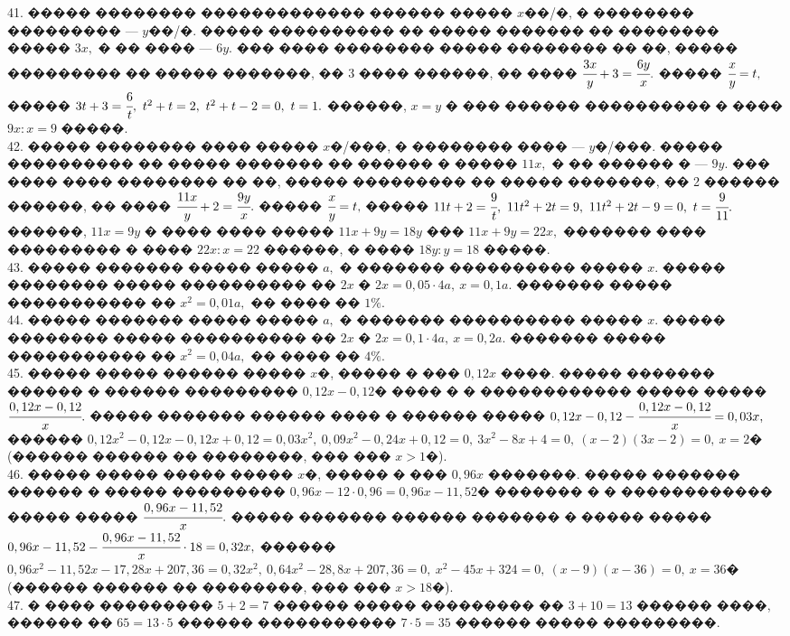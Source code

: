 \documentclass[12pt]{article}
\begin{document}
41. ����� �������� ������������� ������ ����� $x$��/�, � �������� ��������� --- $y$��/�. ����� ���������� �� ����� ������� �� �������� ����� $3x,$ � �� ���� --- $6y.$ ��� ���� �������� ����� �������� �� ��, ����� ��������� �� ����� �������, �� 3 ���� ������, �� ���� $\cfrac{3x}{y}+3=\cfrac{6y}{x}.$ ����� $\cfrac{x}{y}=t,$ ����� $3t+3=\cfrac{6}{t},\ t^2+t=2,\ t^2+t-2=0,\ t=1.$ ������, $x=y$ � ��� ������ ���������� � ���� $9x:x=9$ �����.\\
42. ����� �������� ���� ����� $x$�/���, � �������� ���� --- $y$�/���. ����� ���������� �� ����� ������� �� ������ � ����� $11x,$ � �� ������ � --- $9y.$ ��� ���� ���� �������� �� ��, ����� ��������� �� ����� �������, �� 2 ������ ������, �� ���� $\cfrac{11x}{y}+2=\cfrac{9y}{x}.$ ����� $\cfrac{x}{y}=t,$ ����� $11t+2=\cfrac{9}{t},\ 11t^2+2t=9,\ 11t^2+2t-9=0,\ t=\cfrac{9}{11}.$ ������, $11x=9y$ � ���� ���� ����� $11x+9y=18y$ ��� $11x+9y=22x,$ ������� ���� ��������� � ���� $22x:x=22$ ������, � ���� $18y:y=18$ �����.\\
43. ����� ������� ����� ����� $a,$ � ������� ���������� ����� $x.$ ����� �������� ����� ���������� �� $2x$ � $2x=0,05\cdot4a,\ x=0,1a.$ ������� ����� ����������� �� $x^2=0,01a,$ �� ���� �� $1\%.$\\
44. ����� ������� ����� ����� $a,$ � ������� ���������� ����� $x.$ ����� �������� ����� ���������� �� $2x$ � $2x=0,1\cdot4a,\ x=0,2a.$ ������� ����� ����������� �� $x^2=0,04a,$ �� ���� �� $4\%.$\\
45. ����� ����� ������ ����� $x$�, ����� � ��� $0,12x$ ����. ����� ������� ������ � ������ ��������� $0,12x-0,12$� ���� � � ������������ ����� ����� $\cfrac{0,12x-0,12}{x}.$ ����� ������� ������ ���� � ������ ����� $0,12x-0,12-\cfrac{0,12x-0,12}{x}=0,03x,$ ������ $0,12x^2-0,12x-0,12x+0,12=0,03x^2,\ 0,09x^2-0,24x+0,12=0,\ 3x^2-8x+4=0,\ (x-2)(3x-2)=0,\ x=2$� (������ ������ �� ��������, ��� ��� $x>1$�).\\
46. ����� ����� ����� ����� $x$�, ����� � ��� $0,96x$ �������. ����� ������� ������ � ����� ��������� $0,96x-12\cdot0,96=0,96x-11,52$� ������� � � ������������ ����� ����� $\cfrac{0,96x-11,52}{x}.$ ����� ������� ������ ������� � ����� ����� $0,96x-11,52-\cfrac{0,96x-11,52}{x}\cdot18=0,32x,$ ������ $0,96x^2-11,52x-17,28x+207,36=0,32x^2,\ 0,64x^2-28,8x+207,36=0,\ x^2-45x+324=0,\ (x-9)(x-36)=0,\ x=36$� (������ ������ �� ��������, ��� ��� $x>18$�).\\
47. � ���� ��������� $5+2=7$ ������ ����� ��������� �� $3+10=13$ ������ ����, ������ �� $65=13\cdot5$ ������ ����������� $7\cdot5=35$ ������ ����� ���������.\\
\end{document}
